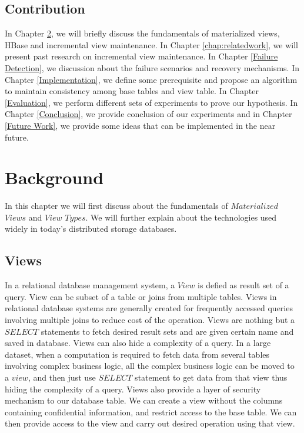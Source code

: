 \documentclass[11pt,a4paper,bibtotoc,idxtotoc,headsepline,footsepline,footexclude,BCOR12mm,DIV13]{scrbook}
\begin{document}
\section{Contribution}
In Chapter \ref{chap:background}, we will briefly discuss the fundamentals of materialized views, HBase and incremental view maintenance. In Chapter \ref{chap:relatedwork}, we will present past research on incremental view maintenance. In Chapter \ref{Failure Detection}, we discussion about the failure scenarios and recovery mechanisms. In Chapter \ref{Implementation}, we define some prerequisite and propose an algorithm to maintain consistency among base tables and view table. In Chapter \ref{Evaluation}, we perform different sets of experiments to prove our hypothesis. In Chapter \ref{Conclusion}, we provide conclusion of our experiments and in Chapter \ref{Future Work}, we provide some ideas that can be implemented in the near future.


\chapter{Background}
\label{chap:background}

In this chapter we will first discuss about the fundamentals of $Materialized$ $Views$ and $View$ $Types$. We will further explain about the technologies used widely in today's distributed storage databases. 

\section{Views}
In a relational database management system, a $View$ is defied as result set of a query. View can be subset of a table or joins from multiple tables. Views in relational database systems are generally created for frequently accessed queries involving multiple joins to reduce cost of the operation. Views are nothing but a $SELECT$ statements to fetch desired result sets and are given certain name and saved in database. Views can also hide a complexity of a query. In a large dataset, when a computation is required to fetch data from several tables involving complex business logic, all the complex business logic can be moved to a $view$, and then just use $SELECT$ statement to get data from that view thus hiding the complexity of a query. Views also provide a layer of security mechanism to our database table. We can create a view without the columns containing confidential information, and restrict access to the base table. We can then provide access to the view and carry out desired operation using that view. 
\end{document}
